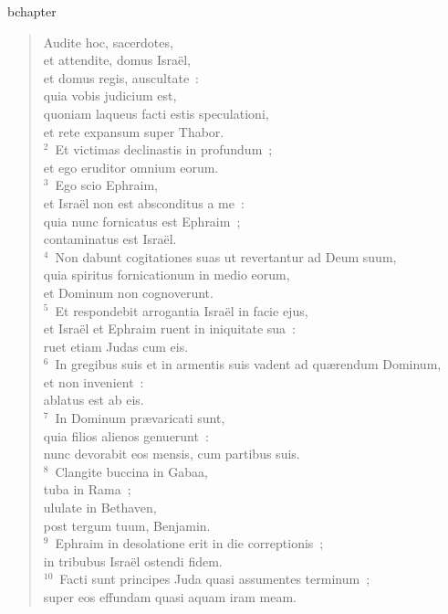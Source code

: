 bchapter\begin{verse}\vspace{-19pt}Audite hoc, sacerdotes, \\ et attendite, domus Isra\"el,\\ et domus regis, auscultate~:\\ quia vobis judicium est,\\ quoniam laqueus facti estis speculationi,\\ et rete expansum super Thabor.\\
${}^{2}$~Et victimas declinastis in profundum~;\\ et ego eruditor omnium eorum.\\
${}^{3}$~Ego scio Ephraim,\\ et Isra\"el non est absconditus a me~:\\ quia nunc fornicatus est Ephraim~;\\ contaminatus est Isra\"el.\\
${}^{4}$~Non dabunt cogitationes suas ut revertantur ad Deum suum,\\ quia spiritus fornicationum in medio eorum,\\ et Dominum non cognoverunt.\\
${}^{5}$~Et respondebit arrogantia Isra\"el in facie ejus,\\ et Isra\"el et Ephraim ruent in iniquitate sua~:\\ ruet etiam Judas cum eis.\\
${}^{6}$~In gregibus suis et in armentis suis vadent ad qu\ae rendum Dominum,\\ et non invenient~:\\ ablatus est ab eis.\\
${}^{7}$~In Dominum pr\ae varicati sunt,\\ quia filios alienos genuerunt~:\\ nunc devorabit eos mensis, cum partibus suis.\\
${}^{8}$~Clangite buccina in Gabaa,\\ tuba in Rama~;\\ ululate in Bethaven,\\ post tergum tuum, Benjamin.\\
${}^{9}$~Ephraim in desolatione erit in die correptionis~;\\ in tribubus Isra\"el ostendi fidem.\\
${}^{10}$~Facti sunt principes Juda quasi assumentes terminum~;\\ super eos effundam quasi aquam iram meam.\\

\end{verse}

